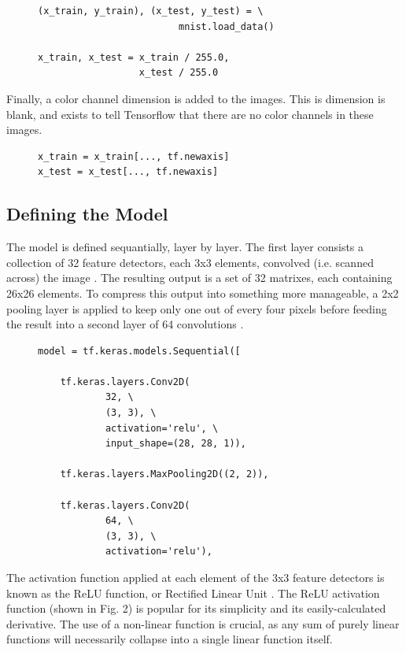 \documentclass[transmag]{IEEEtran}
\begin{document}
\begin{figure}[H]
\begin{Verbatim}
(x_train, y_train), (x_test, y_test) = \
                         mnist.load_data()

x_train, x_test = x_train / 255.0,
                  x_test / 255.0
\end{Verbatim}
\end{figure}

\noindent Finally, a color channel dimension is added to the images. This is
dimension is blank, and exists to tell Tensorflow that there are no color
channels in these images.

\begin{figure}[H]
\begin{Verbatim}
x_train = x_train[..., tf.newaxis]
x_test = x_test[..., tf.newaxis]
\end{Verbatim}
\end{figure}

\subsection{Defining the Model}

The model is defined sequantially, layer by layer. The first layer consists
a collection of 32 feature detectors, each 3x3 elements, convolved (i.e. 
scanned across) the image \cite{ref2}. The resulting output is a set of 32 
matrixes, each containing 26x26 elements. To compress this output into 
something more manageable, a 2x2 pooling layer is applied to keep only one out 
of every four pixels before feeding the result into a second layer of 64 
convolutions \cite{ref3}.

\begin{figure}[H]
\begin{Verbatim}
model = tf.keras.models.Sequential([

    tf.keras.layers.Conv2D(
            32, \
            (3, 3), \
            activation='relu', \
            input_shape=(28, 28, 1)),

    tf.keras.layers.MaxPooling2D((2, 2)),

    tf.keras.layers.Conv2D(
            64, \
            (3, 3), \
            activation='relu'),
\end{Verbatim}
\end{figure}

The activation function applied at each element of the 3x3 feature detectors
is known as the ReLU function, or Rectified Linear Unit \cite{ref4}. The ReLU activation 
function (shown in Fig. 2) is popular for its simplicity and its 
easily-calculated derivative. The use of a non-linear function is crucial, as
any sum of purely linear functions will necessarily collapse into a single 
linear function itself.
\end{document}
